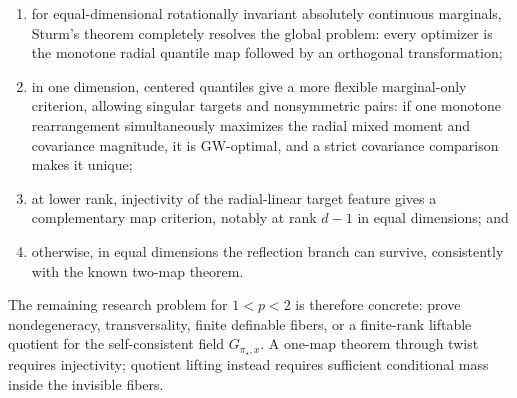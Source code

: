 \documentclass[11pt,a4paper]{article}
\theoremstyle{definition}
\theoremstyle{remark}
\begin{document}
\begin{enumerate}[label=\arabic*.]
  dual contact fibers is an exact twist-based map criterion, and a centered
  spherical target satisfies it automatically;
  \item for equal-dimensional rotationally invariant absolutely continuous
  marginals, Sturm's theorem completely resolves the global problem: every
  optimizer is the monotone radial quantile map followed by an orthogonal
  transformation;
  \item in one dimension, centered quantiles give a more flexible
  marginal-only criterion, allowing singular targets and nonsymmetric pairs:
  if one monotone rearrangement simultaneously maximizes the radial mixed
  moment and covariance magnitude, it is GW-optimal, and a strict covariance
  comparison makes it unique;
  \item at lower rank, injectivity of the radial-linear target feature gives a
  complementary map criterion, notably at rank \(d-1\) in equal dimensions;
  and
  \item otherwise, in equal dimensions the reflection branch can survive,
  consistently with the known two-map theorem.
\end{enumerate}
The remaining research problem for \(1<p<2\) is therefore concrete: prove
nondegeneracy, transversality, finite definable fibers, or a finite-rank
liftable quotient for the self-consistent field \(G_{\pi_\star,x}\).  A
one-map theorem through twist requires injectivity; quotient lifting instead
requires sufficient conditional mass inside the invisible fibers.

\begingroup
\small
\setlength{\bibsep}{2pt plus 1pt}


\endgroup
\end{document}
